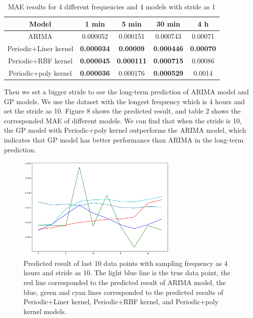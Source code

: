 \documentclass[12pt]{article}
\begin{document}
\begin{table}[H]
\centering
\begin{tabular}{|c|c|c|c|c|}
\hline
Model                 & 1 min             & 5 min             & 30 min            & 4 h              \\ \hline
ARIMA                 & 0.000052          & 0.000151          & 0.000743          & 0.00071          \\ \hline
Periodic+Liner kernel & \textbf{0.000034} & \textbf{0.00009}  & \textbf{0.000446} & \textbf{0.00070} \\ \hline
Periodic+RBF kernel   & \textbf{0.000045} & \textbf{0.000111} & \textbf{0.000715} & 0.00086          \\ \hline
Periodic+poly kernel  & \textbf{0.000036} & 0.000176          & \textbf{0.000529} & 0.0014           \\ \hline
\end{tabular}
\caption{MAE results for 4 different frequencies and 4 models with stride as 1}
\end{table}


Then we set a bigger stride to see the long-term prediction of ARIMA model and GP models. We use the dataset with the longest frequency which is 4 hours and set the stride as 10. Figure 8 shows the predicted result, and table 2 shows the corresponded MAE of different models. We can find that when the stride is 10, the GP model with Periodic+poly kernel outperforms the ARIMA model, which indicates that GP model has better performance than ARIMA in the long-term prediction.



\begin{figure}[H]
\centering 
\includegraphics[width=0.7\textwidth]{fig/section3/h4_h10_all_together.png}
\centering 
\caption{Predicted result of last 10 data points with sampling frequency as 4 hours and stride as 10. The light blue line is the true data point, the red line corresponded to the predicted result of ARIMA model, the blue, green and cyan lines corresponded to the predicted results of Periodic+Liner kernel, Periodic+RBF kernel, and Periodic+poly kernel models.}
\label{fig:grammar}
\end{figure}
\end{document}
